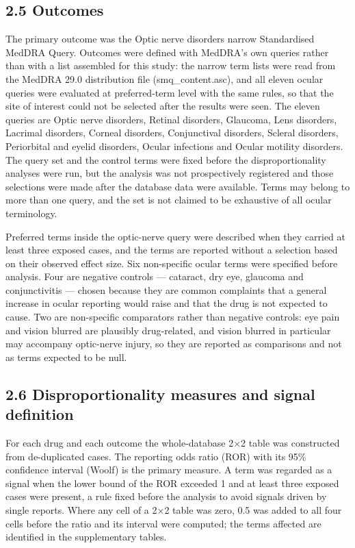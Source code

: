 \documentclass[12pt,a4paper]{article}
\begin{document}
\subsection*{2.5 Outcomes}

The primary outcome was the Optic nerve disorders narrow Standardised MedDRA Query. Outcomes were defined with MedDRA's own queries rather than with a list assembled for this study: the narrow term lists were read from the MedDRA 29.0 distribution file (smq\_content.asc), and all eleven ocular queries were evaluated at preferred-term level with the same rules, so that the site of interest could not be selected after the results were seen. The eleven queries are Optic nerve disorders, Retinal disorders, Glaucoma, Lens disorders, Lacrimal disorders, Corneal disorders, Conjunctival disorders, Scleral disorders, Periorbital and eyelid disorders, Ocular infections and Ocular motility disorders. The query set and the control terms were fixed before the disproportionality analyses were run, but the analysis was not prospectively registered and those selections were made after the database data were available. Terms may belong to more than one query, and the set is not claimed to be exhaustive of all ocular terminology.

Preferred terms inside the optic-nerve query were described when they carried at least three exposed cases, and the terms are reported without a selection based on their observed effect size. Six non-specific ocular terms were specified before analysis. Four are negative controls — cataract, dry eye, glaucoma and conjunctivitis — chosen because they are common complaints that a general increase in ocular reporting would raise and that the drug is not expected to cause. Two are non-specific comparators rather than negative controls: eye pain and vision blurred are plausibly drug-related, and vision blurred in particular may accompany optic-nerve injury, so they are reported as comparisons and not as terms expected to be null.

\subsection*{2.6 Disproportionality measures and signal definition}

For each drug and each outcome the whole-database 2×2 table was constructed from de-duplicated cases. The reporting odds ratio (ROR) with its 95\% confidence interval (Woolf) is the primary measure. A term was regarded as a signal when the lower bound of the ROR exceeded 1 and at least three exposed cases were present, a rule fixed before the analysis to avoid signals driven by single reports. Where any cell of a 2×2 table was zero, 0.5 was added to all four cells before the ratio and its interval were computed; the terms affected are identified in the supplementary tables.
\end{document}
